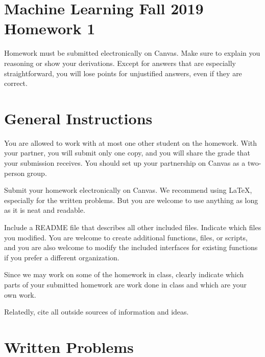 \documentclass[10pt]{article}
\begin{document}
\section*{Machine Learning Fall 2019 Homework 1}

Homework must be submitted electronically on Canvas. Make sure to explain you reasoning or show your derivations. Except for answers that are especially straightforward, you will lose points for unjustified answers, even if they are correct. 

\section*{General Instructions}

You are allowed to work with at most one other student on the homework. With your partner, you will submit only one copy, and you will share the grade that your submission receives. You should set up your partnership on Canvas as a two-person group. 

Submit your homework electronically on Canvas. We recommend using LaTeX, especially for the written problems. But you are welcome to use anything as long as it is neat and readable. 

Include a README file that describes all other included files. Indicate which files you modified. You are welcome to create additional functions, files, or scripts, and you are also welcome to modify the included interfaces for existing functions if you prefer a different organization. 

Since we may work on some of the homework in class, clearly indicate which parts of your submitted homework are work done in class and which are your own work. 

Relatedly, cite all outside sources of information and ideas. 

\section*{Written Problems}
\end{document}
